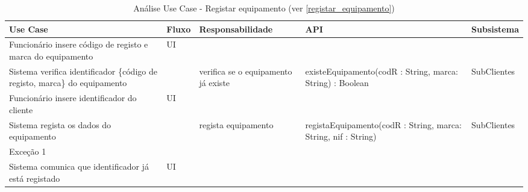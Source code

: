 \documentclass[../relatorio.tex]{subfiles}
\begin{document}
\begin{landscape}
    \begin{table}[!h]
        \centering
        \begin{tabular}{|p{5cm}|p{1cm}|p{4cm}|p{6cm}|p{3cm}|}
            \hline
            \rowcolor{gray!20!white}
            Use Case & Fluxo                                            & Responsabilidade & API & Subsistema \\
            \hline
            \rowcolor{yellow}
            Funcionário insere código de registo e marca do equipamento
                     & UI
                     & 
                     & 
                     & 
            \\
            \hline
            Sistema verifica identificador \{código de registo, marca\} do equipamento
                     & 
                     & verifica se o equipamento já existe
                     & existeEquipamento(codR : String, marca: String) : Boolean
                     & SubClientes
            \\
            \hline
            \rowcolor{yellow}
            Funcionário insere identificador do cliente
                     & UI
                     & 
                     & 
                     & 
            \\
            \hline
            Sistema regista os dados do equipamento
                     & 
                     & regista equipamento
                     & registaEquipamento(codR : String, marca: String, nif : String)
                     & SubClientes
            \\
            \hline
            \rowcolor{red!30}
            Exceção 1  &                                                  &                  &     &            \\
            \hline
            Sistema comunica que identificador já está registado
                     & UI
                     & 
                     & 
                     & 
            \\
            \hline
        \end{tabular}
        \caption{Análise Use Case - Registar equipamento (ver \ref{registar_equipamento})}
    \end{table}
\end{landscape}
\end{document}

